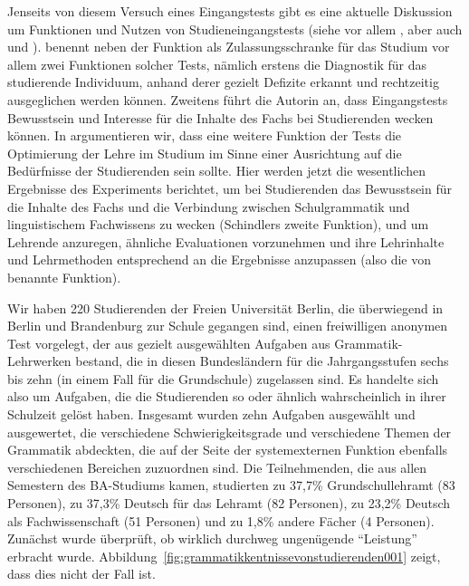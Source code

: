 Jenseits von diesem Versuch eines Eingangstests gibt es eine aktuelle Diskussion um Funktionen und Nutzen von Studieneingangstests (siehe vor allem \citealt{Schindler2016}, aber \zB auch \citealt{Bremerichvos2016} und \citealt{FuhrhopTeuber2016}).
\citet[16]{Schindler2016} benennt neben der Funktion als Zulassungsschranke für das Studium vor allem zwei Funktionen solcher Tests, nämlich erstens die Diagnostik für das studierende Individuum, anhand derer gezielt Defizite erkannt und rechtzeitig ausgeglichen werden können.
Zweitens führt die Autorin an, dass Eingangstests Bewusstsein und Interesse für die Inhalte des Fachs bei Studierenden wecken können.
In \citet[226]{SchaeferSayatz2017a} argumentieren wir, dass eine weitere Funktion der Tests die Optimierung der Lehre im Studium im Sinne einer Ausrichtung auf die Bedürfnisse der Studierenden sein sollte.
Hier werden jetzt die wesentlichen Ergebnisse des Experiments berichtet, um bei Studierenden das Bewusstsein für die Inhalte des Fachs und die Verbindung zwischen Schulgrammatik und linguistischem Fachwissens zu wecken (Schindlers zweite Funktion), und um Lehrende anzuregen, ähnliche Evaluationen vorzunehmen und ihre Lehrinhalte und Lehrmethoden entsprechend an die Ergebnisse anzupassen (also die von \citealt{SchaeferSayatz2017a} benannte Funktion).

Wir haben 220 Studierenden der Freien Universität Berlin, die überwiegend in Berlin und Brandenburg zur Schule gegangen sind, einen freiwilligen anonymen Test vorgelegt, der aus gezielt ausgewählten Aufgaben aus Grammatik-Lehrwerken bestand, die in diesen Bundesländern für die Jahrgangsstufen sechs bis zehn (in einem Fall für die Grundschule) zugelassen sind.
Es handelte sich also um Aufgaben, die die Studierenden so oder ähnlich wahrscheinlich in ihrer Schulzeit gelöst haben.
Insgesamt wurden zehn Aufgaben ausgewählt und ausgewertet, die verschiedene Schwierigkeitsgrade und verschiedene Themen der Grammatik abdeckten, die auf der Seite der systemexternen Funktion ebenfalls verschiedenen Bereichen zuzuordnen sind.
Die Teilnehmenden, die aus allen Semestern des BA-Studiums kamen, studierten zu 37,7\% Grundschullehramt (83 Personen), zu 37,3\% Deutsch für das Lehramt (82 Personen), zu 23,2\% Deutsch als Fachwissenschaft (51 Personen) und zu 1,8\% andere Fächer (4 Personen).
Zunächst wurde überprüft, ob wirklich durchweg ungenügende "`Leistung"' erbracht wurde.
Abbildung~\ref{fig:grammatikkentnissevonstudierenden001} zeigt, dass dies nicht der Fall ist.

